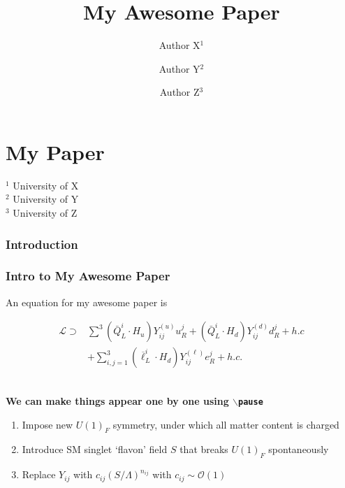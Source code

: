 \documentclass[usenames,dvipsnames, 8pt]{beamer}
\begin{document}
\title{My Awesome Paper}
\section{My Paper}
\author{\large Author X$^1$ \and Author Y$^2$ \and Author Z$^3$}
\date{}
\begin{frame}
\maketitle

\vspace{-2.5cm}

\begin{center}
{\small {}$^1$ University of X}\\
{\small {}$^2$ University of Y}\\
{\small {}$^3$ University of Z}
\end{center}
\end{frame}

\begin{frame}
\subsubsection{Introduction}
\frametitle{Intro to My Awesome Paper}

An equation for my awesome paper is

\begin{align*}
\mathcal{L} \supset &\sum^{3}\left(\bar{Q}_{L}^{i} \cdot H_{u}\right) Y^{(u)}_{ij} u_{R}^{j}+\left(\bar{Q}_{L}^{i} \cdot H_{d}\right) Y^{(d)}_{ij} d_{R}^{j}+h.c \nonumber \\
&+\sum_{i, j=1}^{3}\left(\overline{\ell}_{L}^{i} \cdot H_{d}\right)Y^{(\ell)}_{ij} e_{R}^{j}+h . c .
\end{align*}

\ \\[.5cm]

{\bf We can make things appear one by one using \texttt{$\backslash$pause}}\ \\[.3cm]
\begin{enumerate}
\pause
\item Impose new $U(1)_F$ symmetry, under which all matter content is charged
\pause
\item Introduce SM singlet `flavon' field $S$ that breaks $U(1)_F$ spontaneously 
\pause
\item Replace $Y_{ij}$ with $c_{ij}(S/\Lambda)^{n_{ij}}$ with $c_{ij}\sim \mathcal{O}(1)$
\end{enumerate}  

\ \\[.2cm]


\end{frame}
\end{document}
